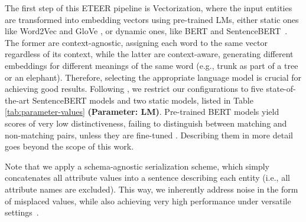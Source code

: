 The first step of this ETEER pipeline is Vectorization, where the input entities are transformed into embedding vectors using pre-trained LMs, either static ones like Word2Vec \cite{DBLP:journals/corr/abs-1301-3781} and GloVe \cite{DBLP:conf/emnlp/PenningtonSM14}, or dynamic ones, like BERT \cite{DBLP:conf/naacl/DevlinCLT19} and SentenceBERT~\cite{DBLP:conf/emnlp/ReimersG19}.
The former are context-agnostic, assigning each word to the same vector regardless of its context, while the latter are context-aware, generating different embeddings for different meanings of the same word (e.g., trunk as part of a tree or an elephant). Therefore, selecting the appropriate language model is crucial for achieving good results. Following \cite{DBLP:journals/pvldb/ZeakisPSK23}, we restrict our configurations to five state-of-the-art SentenceBERT models and two static models, listed in Table \ref{tab:parameter-values} 
\textbf{(Parameter: LM)}. 
Pre-trained BERT models yield scores of very low distinctiveness, failing to distinguish between matching and non-matching pairs, unless
they are fine-tuned \cite{DBLP:journals/pvldb/ZeakisPSK23}.
Describing them in more detail goes beyond the scope of this work.



Note that we apply a schema-agnostic serialization scheme, which simply concatenates all attribute values into a sentence describing each entity (i.e., all attribute names are excluded). This way, we inherently address noise in the form of misplaced values, while also achieving very high performance under versatile settings~\cite{DBLP:journals/pvldb/ZeakisPSK23}.

